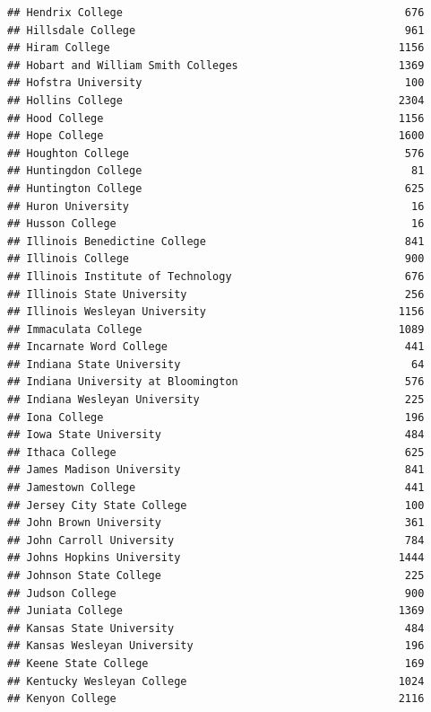 \documentclass[
]{article}
\begin{document}
\begin{verbatim}
## Hendrix College                                            676
## Hillsdale College                                          961
## Hiram College                                             1156
## Hobart and William Smith Colleges                         1369
## Hofstra University                                         100
## Hollins College                                           2304
## Hood College                                              1156
## Hope College                                              1600
## Houghton College                                           576
## Huntingdon College                                          81
## Huntington College                                         625
## Huron University                                            16
## Husson College                                              16
## Illinois Benedictine College                               841
## Illinois College                                           900
## Illinois Institute of Technology                           676
## Illinois State University                                  256
## Illinois Wesleyan University                              1156
## Immaculata College                                        1089
## Incarnate Word College                                     441
## Indiana State University                                    64
## Indiana University at Bloomington                          576
## Indiana Wesleyan University                                225
## Iona College                                               196
## Iowa State University                                      484
## Ithaca College                                             625
## James Madison University                                   841
## Jamestown College                                          441
## Jersey City State College                                  100
## John Brown University                                      361
## John Carroll University                                    784
## Johns Hopkins University                                  1444
## Johnson State College                                      225
## Judson College                                             900
## Juniata College                                           1369
## Kansas State University                                    484
## Kansas Wesleyan University                                 196
## Keene State College                                        169
## Kentucky Wesleyan College                                 1024
## Kenyon College                                            2116

\end{verbatim}
\end{document}
